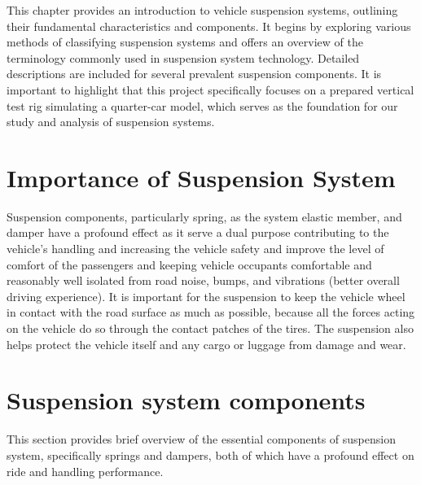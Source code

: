 This chapter provides an introduction to vehicle suspension systems, outlining their fundamental characteristics and components. It begins by exploring various methods of classifying suspension systems and offers an overview of the terminology commonly used in suspension system technology. Detailed descriptions are included for several prevalent suspension components. It is important to highlight that this project specifically focuses on a prepared vertical test rig simulating a quarter-car model, which serves as the foundation for our study and analysis of suspension systems. 


\section{Importance of Suspension System}
Suspension components, particularly spring, as the system elastic member, and damper have a profound effect as it serve a dual purpose contributing to the vehicle's handling and increasing the vehicle safety and improve the level of comfort of the passengers and keeping vehicle occupants comfortable and reasonably well isolated from road noise, bumps, and vibrations (better overall driving experience). It is important for the suspension to keep the vehicle wheel in contact with the road surface as much as possible, because all the forces acting on the vehicle do so through the contact patches of the tires. The suspension also helps protect the vehicle itself and any cargo or luggage from damage and wear. \cite{barton2018automotive}

\section{Suspension system components}

This section provides brief overview of the essential components of suspension system, specifically springs and dampers, both of which have a profound effect on ride and handling performance. \cite{happian-smith2001introduction}

